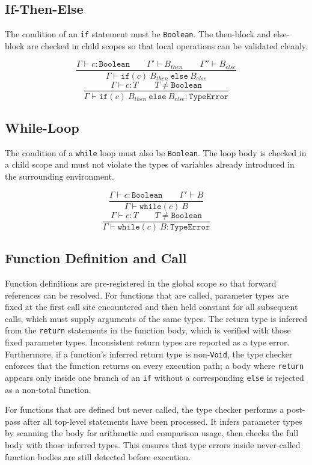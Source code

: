 \subsection{If-Then-Else}
The condition of an \texttt{if} statement must be \texttt{Boolean}. The
then-block and else-block are checked in child scopes so that local operations
can be validated cleanly.

\[
  \frac{\Gamma \vdash c : \texttt{Boolean} \qquad
        \Gamma' \vdash B_{then} \qquad
        \Gamma'' \vdash B_{else}}
       {\Gamma \vdash \texttt{if}(c)\ B_{then}\ \texttt{else}\ B_{else}}
\]
\[
  \frac{\Gamma \vdash c : T \qquad T \neq \texttt{Boolean}}
  {\Gamma \vdash \texttt{if}(c)\ B_{then}\ \texttt{else}\ B_{else} : \texttt{TypeError}}
\]

\subsection{While-Loop}
The condition of a \texttt{while} loop must also be \texttt{Boolean}. The loop
body is checked in a child scope and must not violate the types of variables
already introduced in the surrounding environment.

\[
  \frac{\Gamma \vdash c : \texttt{Boolean} \qquad \Gamma' \vdash B}
       {\Gamma \vdash \texttt{while}(c)\ B}
\]
\[
  \frac{\Gamma \vdash c : T \qquad T \neq \texttt{Boolean}}
  {\Gamma \vdash \texttt{while}(c)\ B : \texttt{TypeError}}
\]

\subsection{Function Definition and Call}
Function definitions are pre-registered in the global scope so that forward
references can be resolved. For functions that are called, parameter types are
fixed at the first call site encountered and then held constant for all
subsequent calls, which must supply arguments of the same types. The return
type is inferred from the \texttt{return} statements in the function body,
which is verified with those fixed parameter types. Inconsistent return types
are reported as a type error.
Furthermore, if a function's inferred return type is non-\texttt{Void}, the
type checker enforces that the function returns on every execution path; a body
where \texttt{return} appears only inside one branch of an \texttt{if} without
a corresponding \texttt{else} is rejected as a non-total function.

For functions that are defined but never called, the type checker performs a
post-pass after all top-level statements have been processed. It infers
parameter types by scanning the body for arithmetic and comparison usage, then
checks the full body with those inferred types. This ensures that type errors
inside never-called function bodies are still detected before execution.

